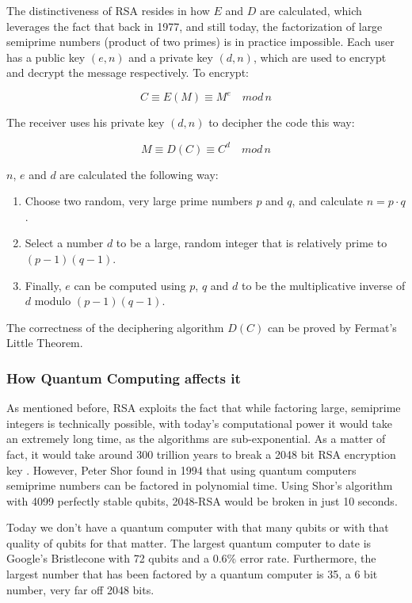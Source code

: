 The distinctiveness of RSA resides in how $E$ and $D$ are calculated, which
leverages the fact that back in 1977, and still today, the factorization of
large semiprime numbers (product of two primes) is in practice impossible. Each
user has a public key $(e, n)$ and a private key $(d,n)$, which are used to encrypt
and decrypt the message respectively. To encrypt:

\begin{equation}
    C \equiv E(M) \equiv M^e \quad mod \, n
\end{equation}

The receiver uses his private key $(d,n)$ to decipher the code this way:

\begin{equation}
    M \equiv D(C) \equiv C^d \quad mod \, n
\end{equation}

$n$, $e$ and $d$ are calculated the following way:
\begin{enumerate}
    \item Choose two random, very large prime numbers $p$ and $q$, and calculate $n = p \cdot q$.
    \item Select a number $d$ to be a large, random integer that is relatively prime to $(p-1)(q-1)$.
    \item Finally, $e$ can be computed using $p$, $q$ and $d$ to be the multiplicative inverse of $d$ modulo $(p-1)(q-1)$.
\end{enumerate}

The correctness of the deciphering algorithm $D(C)$ can be proved by Fermat's Little Theorem.

\subsubsection{How Quantum Computing affects it}

As mentioned before, RSA exploits the fact that while factoring large,
semiprime integers is technically possible, with today’s computational
power it would take an extremely long time, as the algorithms are
sub-exponential. As a matter of fact, it would take around 300 trillion
years to break a 2048 bit RSA encryption key
\cite{andreas_baumhof_breaking_2019}. However, Peter Shor found
in 1994 that using quantum computers semiprime numbers can be factored
in polynomial time. Using Shor’s algorithm with 4099 perfectly stable
qubits, 2048-RSA would be broken in just 10 seconds.

Today we don’t have a quantum computer with that many qubits or with
that quality of qubits for that matter. The largest quantum computer to
date is Google’s Bristlecone with 72 qubits and a 0.6\% error rate.
Furthermore, the largest number that has been factored by a quantum
computer is 35, a 6 bit number, very far off 2048 bits.

